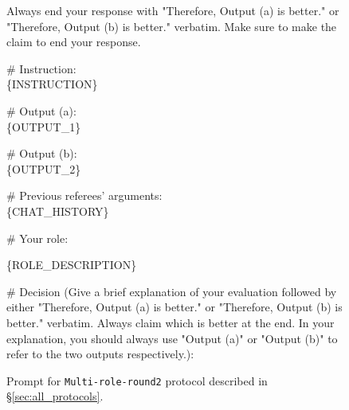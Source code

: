 \begin{figure*}[t!]
\begin{tcolorbox}[colback=black!3!white, colframe=black!70!white, title=Multi-role-round2, fontupper=\footnotesize, fonttitle=\footnotesize]
Always end your response with "Therefore, Output (a) is better." or "Therefore, Output (b) is better." verbatim. Make sure to make the claim to end your response.
\newline

\# Instruction: \\
\{INSTRUCTION\}
\newline

\# Output (a): \\
\{OUTPUT\_1\}
\newline

\# Output (b): \\
\{OUTPUT\_2\}
\newline

\# Previous referees' arguments: \\
\{CHAT\_HISTORY\}
\newline

\# Your role:

\{ROLE\_DESCRIPTION\}
\newline

\# Decision (Give a brief explanation of your evaluation followed by either "Therefore, Output (a) is better." or "Therefore, Output (b) is better." verbatim. Always claim which is better at the end. In your explanation, you should always use "Output (a)" or "Output (b)" to refer to the two outputs respectively.):
\end{tcolorbox}
\caption{Prompt for \texttt{Multi-role-round2} protocol described in \S\ref{sec:all_protocols}.}
\label{fig:prompt_multi-role_debate}
\end{figure*}





